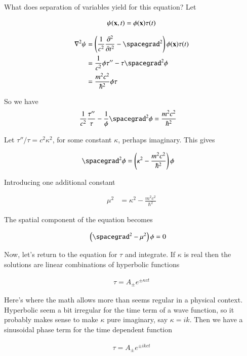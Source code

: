 \documentclass{article}
\newcommand{\PDSq}[2]{\frac{\partial^2 {#2}}{\partial {#1}^2}}
\begin{document}
What does separation of variables yield for this equation?  Let

\begin{align*}
\psi(\mathbf{x},t) = \phi(\mathbf{x})\tau(t)
\end{align*}

\begin{align*}
\grad^2 \psi 
&= \left(\inv{c^2} \PDSq{t}{} - \spacegrad^2 \right) \phi(\Bx)\tau(t) \\
&= \inv{c^2} \phi\tau'' - \tau \spacegrad^2 \phi \\
&= \frac{m^2 c^2}{\hbar^2}\phi\tau
\end{align*}

So we have
\begin{align*}
\inv{c^2} \frac{\tau''}{\tau} - \inv{\phi} \spacegrad^2 \phi &= \frac{m^2 c^2}{\hbar^2}
\end{align*}

Let $\tau''/\tau = c^2 \kappa^2$, for some constant $\kappa$, perhaps imaginary. This gives

\begin{align*}
\spacegrad^2 \phi &= \left( \kappa^2 - \frac{m^2 c^2}{\hbar^2} \right) \phi
\end{align*}

Introducing one additional constant

\begin{align*}
\mu^2 &= \kappa^2 - \frac{m^2 c^2}{\hbar^2} 
\end{align*}

The spatial component of the equation becomes

\begin{align*}
\left( \spacegrad^2 - \mu^2 \right) \phi &= 0
\end{align*}

Now, let's return to the equation for $\tau$ and integrate.  If $\kappa$ is real then the solutions are linear
combinations of hyperbolic functions

\begin{align*}
\tau = A_{\pm} e^{\pm \kappa c t} 
\end{align*}

Here's where the math allows more than seems regular in a physical context.  Hyperbolic seem a bit irregular for the time term of a wave function, so it probably makes sense to make $\kappa$ 
pure imaginary, say $\kappa = i k$.  Then we have a sinusoidal phase term for the time dependent function

\begin{align*}
\tau = A_{\pm} e^{\pm i k c t} 
\end{align*}
\end{document}
